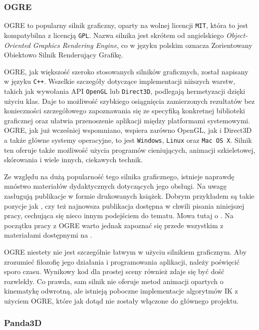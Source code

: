 \documentclass[11pt]{mwrep}
\begin{document}
 
      \subsubsection{OGRE}
 
      OGRE to popularny silnik graficzny, oparty na wolnej licencji \texttt{MIT}, która to jest kompatybilna z licencją \texttt{GPL}. Nazwa silnika jest skrótem od angielskiego \textit{Object-Oriented Graphics Rendering Engine}, co w języku polskim oznacza Zorientowany Obiektowo Silnik Renderujący Grafikę.

      OGRE, jak większość szeroko stosowanych silników graficznych, został napisany w języku \texttt{C++}. Wszelkie szczegóły dotyczące implementacji niższych warstw, takich jak wywołania API \texttt{OpenGL} lub \texttt{Direct3D}, podlegają hermetyzacji dzięki użyciu klas. Daje to możliwość szybkiego osiągnięcia zamierzonych rezultatów bez konieczności szczegółowego zapoznawania się ze specyfiką konkretnej biblioteki graficznej oraz ułatwia przenoszenie aplikacji między platformami systemowymi. OGRE, jak już wcześniej wspomniano, wspiera zarówno OpenGL, jak i Direct3D a także główne systemy operacyjne, to jest \texttt{Windows}, \texttt{Linux} oraz \texttt{Mac OS X}. Silnik ten oferuje także możliwość użycia programów cieniujących, animacji szkieletowej, skórowania i wiele innych, ciekawych technik.

      Ze względu na dużą popularność tego silnika graficznego, istnieje naprawdę mnóstwo materiałów dydaktycznych dotyczących jego obsługi. Na uwagę zasługują publikacje w formie drukowanych książek. Dobrym przykładem są takie pozycje jak \cite{ogreb1}, czy też najnowsza publikacja dostępna w chwili pisania niniejszej pracy, cechująca się nieco innym podejściem do tematu. Mowa tutaj o \cite{ogreb2}. Na początku pracy z OGRE warto jednak zapoznać się przede wszystkim z materiałami dostępnymi na \cite{ogre}.


      OGRE niestety nie jest szczególnie łatwym w użyciu silnikiem graficznym. Aby zrozumieć filozofię jego działania i programowania aplikacji, należy poświęcić sporo czasu. Wynikowy kod dla prostej sceny również zdaje się być dość rozwlekły. Co prawda, sam silnik nie oferuje metod animacji opartych o kinematykę odwrotną, ale istnieją poboczne implementacje algorytmów IK z użyciem OGRE, które jak dotąd nie zostały włączone do głównego projektu.

      \subsubsection{Panda3D}
\end{document}
